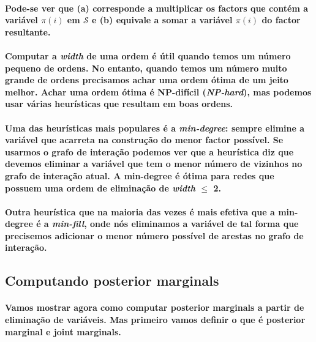 \documentclass[a4paper,10pt]{article}
\theoremstyle{plain}
\begin{document}
\paragraph{
  Pode-se ver que (a) corresponde a multiplicar os factors que contém a variável $\pi(i)$ em
  $\mathcal{S}$ e (b) equivale a somar a variável $\pi(i)$ do factor resultante.
}

\paragraph{
  Computar a \textit{width} de uma ordem é útil quando temos um número pequeno de ordens. No
  entanto, quando temos um número muito grande de ordens precisamos achar uma ordem ótima de um
  jeito melhor. Achar uma ordem ótima é NP-difícil (\textit{NP-hard}), mas podemos usar várias
  heurísticas que resultam em boas ordens.
}

\paragraph{
  Uma das heurísticas mais populares é a \textit{min-degree}: sempre elimine a variável que
  acarreta na construção do menor factor possível. Se usarmos o grafo de interação podemos ver que
  a heurística diz que devemos eliminar a variável que tem o menor número de vizinhos no grafo de
  interação atual. A min-degree é ótima para redes que possuem uma ordem de eliminação de
  \textit{width} $\leq$ 2.
}

\paragraph{
  Outra heurística que na maioria das vezes é mais efetiva que a min-degree é a \textit{min-fill},
  onde nós eliminamos a variável de tal forma que precisemos adicionar o menor número possível de
  arestas no grafo de interação.
}

\subsection{Computando posterior marginals}

\paragraph{
  Vamos mostrar agora como computar posterior marginals a partir de eliminação de variáveis. Mas
  primeiro vamos definir o que é posterior marginal e joint marginals.
}
\end{document}
